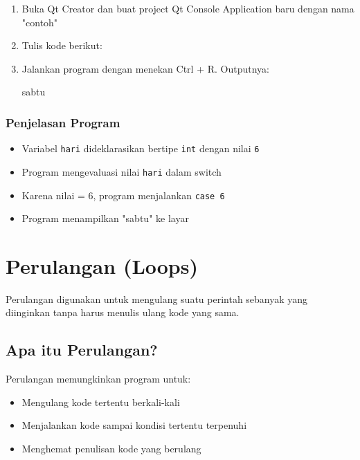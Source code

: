 \begin{enumerate}
\item Buka Qt Creator dan buat project Qt Console Application baru dengan nama "contoh"
\item Tulis kode berikut:



\item Jalankan program dengan menekan Ctrl + R. Outputnya:

\begin{lcverbatim}
sabtu
\end{lcverbatim}
\end{enumerate}

\subsubsection*{Penjelasan Program}

\begin{itemize}
\item Variabel \texttt{hari} dideklarasikan bertipe \texttt{int} dengan nilai \texttt{6}
\item Program mengevaluasi nilai \texttt{hari} dalam switch
\item Karena nilai = 6, program menjalankan \texttt{case 6}
\item Program menampilkan "sabtu" ke layar
\end{itemize}

\section{Perulangan (Loops)}\label{perulangan}

Perulangan digunakan untuk mengulang suatu perintah sebanyak yang diinginkan tanpa harus menulis ulang kode yang sama.

\subsection{Apa itu Perulangan?}

Perulangan memungkinkan program untuk:
\begin{itemize}
\item Mengulang kode tertentu berkali-kali
\item Menjalankan kode sampai kondisi tertentu terpenuhi
\item Menghemat penulisan kode yang berulang
\end{itemize}

